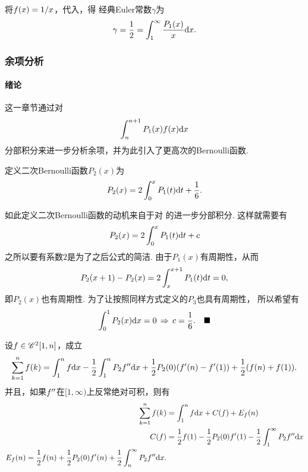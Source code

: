     \begin{cor}[Euler常数]
      将$\mathnormal{f}(x) = 1/x$，代入，得
      经典Euler常数$\gamma$为
      \[
        \gamma = \frac{1}{2} = \int_1^\infty \frac{P_1(x)}{x}\mathrm{d} x.
      \]
    \end{cor}

  \subsubsection{余项分析}
    \paragraph{绪论}
      这一章节通过对
      \begin{equation}
        \label{equ: Euler求和公式余项1}
        \int_n^{n+1}P_1(x)\mathnormal{f}(x)\mathrm{d} x
      \end{equation}
      分部积分来进一步分析余项，并为此引入了更高次的Bernoulli函数.

    \begin{defi}[二次Bernoulli函数]
      定义二次Bernoulli函数$P_2(x)$为
      \[
        P_2(x) = 2\int_0^xP_1(t)\mathrm{d} t + \frac{1}{6}.
      \]
    \end{defi}
    \remark
      如此定义二次Bernoulli函数的动机来自于对
      的进一步分部积分. 这样就需要有
      \[
        P_2(x) = 2\int_0^xP_1(t)\mathrm{d} t + c
      \]
      之所以要有系数$2$是为了之后公式的简洁. 由于$P_1(x)$有周期性，从而
      \[
        P_2(x+1) - P_2(x) = 2\int_x^{x+1}P_1(t)\mathrm{d} t = 0,
      \]
      即$P_2(x)$也有周期性. 为了让按照同样方式定义的$P_3$也具有周期性，
      所以希望有
      \[
        \int_0^1P_2(x)\mathrm{d} x= 0 \,\Rightarrow\, c = \frac{1}{6}.
        \quad\blacksquare
      \]

    \begin{thm}[二次导数形式的Euler求和公式]
      设$\mathnormal{f}\in\mathscr{C}^2[1, n]$，成立
      \[
        \sum_{k=1}^n\mathnormal{f}(k) = \int_1^n\mathnormal{f}\mathrm{d} x
        - \frac{1}{2}\int_1^nP_2\mathnormal{f}^{\prime\prime}\mathrm{d} x
        + \frac{1}{2}P_2(0)(\mathnormal{f}^\prime(n)-\mathnormal{f}^\prime(1))
        + \frac{1}{2}(\mathnormal{f}(n) + \mathnormal{f}(1)).
      \]
      并且，如果$\mathnormal{f}^{\prime\prime}$在$[1, \infty)$上反常绝对可积，则有
      \[\begin{split}
        \sum_{k=1}^n\mathnormal{f}(k) &= \int_1^n\mathnormal{f}\mathrm{d} x + C(\mathnormal{f}) + E_{\mathnormal{f}}(n) \\
        C(\mathnormal{f}) &= \frac{1}{2}\mathnormal{f}(1) - \frac{1}{2}P_2(0)\mathnormal{f}^\prime(1)
        - \frac{1}{2}\int_1^\infty P_2\mathnormal{f}^{\prime\prime}\mathrm{d} x \\
        E_{\mathnormal{f}}(n) = \frac{1}{2}\mathnormal{f}(n) + \frac{1}{2}P_2(0)\mathnormal{f}^\prime(n) +
        \frac{1}{2}\int_n^\infty P_2\mathnormal{f}^{\prime\prime}\mathrm{d} x.
      \end{split}\]
    \end{thm}

